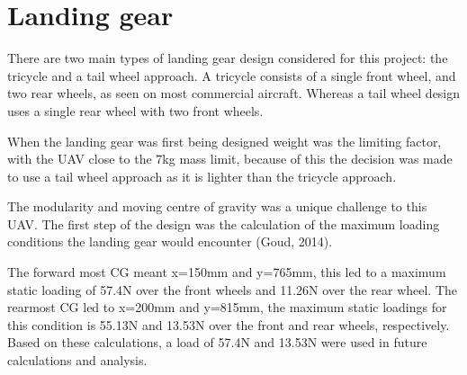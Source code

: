 \documentclass[../../main.tex]{subfiles}
\begin{document}
\section{Landing gear} \label{sec:final-design-proposal:landing-gear}

There are two main types of landing gear design considered for this project: the tricycle and a tail wheel approach. A tricycle consists of a single front wheel, and two rear wheels, as seen on most commercial aircraft.
Whereas a tail wheel design uses a single rear wheel with two front wheels.


When the landing gear was first being designed  weight was the limiting factor, with the UAV close to the 7kg mass limit, because of this the decision was made to use a tail wheel approach as it is lighter than the tricycle approach.

The modularity and moving centre of gravity was a unique challenge to this UAV.
The first step of the design was the calculation of the maximum loading conditions the landing gear would encounter (Goud, 2014). 


The forward most CG meant x=150mm and y=765mm, this led to a maximum static loading of 57.4N over the front wheels and 11.26N over the rear wheel.
The rearmost CG led to x=200mm and y=815mm, the maximum static loadings for this condition is 55.13N and 13.53N over the front and rear wheels, respectively.
Based on these calculations, a load of 57.4N and 13.53N were used in future calculations and analysis. 
\end{document}
